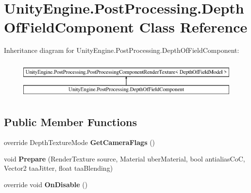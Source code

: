 \hypertarget{class_unity_engine_1_1_post_processing_1_1_depth_of_field_component}{}\section{Unity\+Engine.\+Post\+Processing.\+Depth\+Of\+Field\+Component Class Reference}
\label{class_unity_engine_1_1_post_processing_1_1_depth_of_field_component}
Inheritance diagram for Unity\+Engine.\+Post\+Processing.\+Depth\+Of\+Field\+Component\+:\begin{figure}[H]
\begin{center}
\leavevmode
\includegraphics[height=2.000000cm]{class_unity_engine_1_1_post_processing_1_1_depth_of_field_component}
\end{center}
\end{figure}
\subsection*{Public Member Functions}
\begin{DoxyCompactItemize}
\item 
\mbox{\label{class_unity_engine_1_1_post_processing_1_1_depth_of_field_component_ae3e41cb8eaf704a76c63528712d1e6ef}} 
override Depth\+Texture\+Mode {\bfseries Get\+Camera\+Flags} ()
\item 
\mbox{\label{class_unity_engine_1_1_post_processing_1_1_depth_of_field_component_a32180b99bf66ab361b862106862d523c}} 
void {\bfseries Prepare} (Render\+Texture source, Material uber\+Material, bool antialias\+CoC, Vector2 taa\+Jitter, float taa\+Blending)
\item 
\mbox{\label{class_unity_engine_1_1_post_processing_1_1_depth_of_field_component_aec0f639cfc6cbcab6b2ceef5c3de31db}} 
override void {\bfseries On\+Disable} ()
\end{DoxyCompactItemize}
